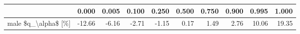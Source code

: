 \begin{tabular}{lrrrrrrrrr}
\toprule
{} &  0.000 &  0.005 &  0.100 &  0.250 &  0.500 &  0.750 &  0.900 &  0.995 &  1.000 \\
\midrule
male \$q\_\textbackslash alpha\$ [\%] & -12.66 &  -6.16 &  -2.71 &  -1.15 &   0.17 &   1.49 &   2.76 &  10.06 &  19.35 \\
\bottomrule
\end{tabular}

